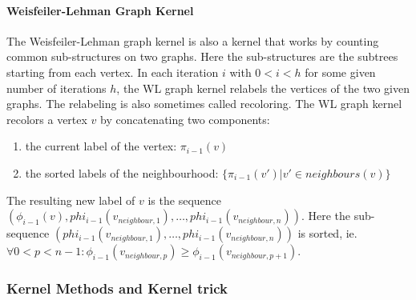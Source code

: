 \paragraph{Weisfeiler-Lehman Graph Kernel}
The Weisfeiler-Lehman graph kernel is also a kernel that works by counting common sub-structures on two graphs.
Here the sub-structures are the subtrees starting from each vertex.
In each iteration $i$ with $0 < i < h$ for some given number of iterations $h$, the WL graph kernel relabels the vertices of the two given graphs. The relabeling is also sometimes called recoloring.
The WL graph kernel recolors a vertex $v$ by concatenating two components:

\begin{enumerate}
    \item{the current label of the vertex: $\pi_{i-1}(v)$}
    \item{the sorted labels of the neighbourhood: $\{ \pi_{i-1}(v') | v' \in neighbours(v) \}$}
\end{enumerate}

The resulting new label of $v$ is the sequence $(\phi_{i-1}(v), phi_{i-1}(v_{neighbour,1}), \dots , phi_{i-1}(v_{neighbour,n}))$. Here the sub-sequence $(phi_{i-1}(v_{neighbour,1}), \dots , phi_{i-1}(v_{neighbour,n}))$ is sorted, ie. $\forall 0 < p < n - 1: \phi_{i - 1}(v_{neighbour,p}) \geq \phi_{i - 1}(v_{neighbour,p+1})$.


\subsubsection{Kernel Methods and Kernel trick}



